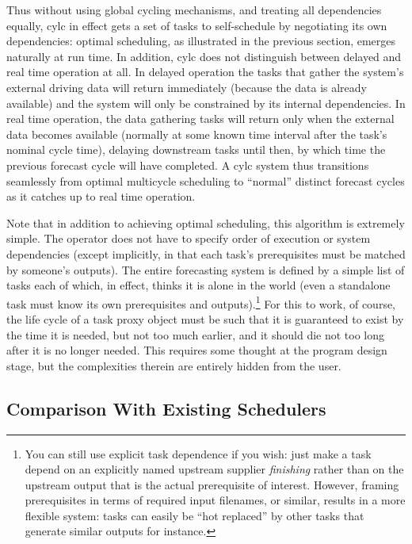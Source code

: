 \documentclass[11pt,a4paper]{article}
\begin{document}
Thus without using global cycling mechanisms, and treating all
dependencies equally, cylc in effect gets a set of tasks to
self-schedule by negotiating its own dependencies: optimal scheduling,
as illustrated in the previous section, emerges naturally at run time.
In addition, cylc does not distinguish between delayed and real time
operation at all. In delayed operation the tasks that gather the
system's external driving data will return immediately (because the data
is already available) and the system will only be constrained by its
internal dependencies. In real time operation, the data gathering tasks
will return only when the external data becomes available (normally at
some known time interval after the task's nominal cycle time), delaying
downstream tasks until then, by which time the previous forecast cycle
will have completed. A cylc system thus transitions seamlessly from
optimal multicycle scheduling to ``normal'' distinct forecast cycles as
it catches up to real time operation.

Note that in addition to achieving optimal scheduling, this algorithm is
extremely simple. The operator does not have to specify order of
execution or system dependencies (except implicitly, in that each task's
prerequisites must be matched by someone's outputs). The entire
forecasting system is defined by a simple list of tasks each of which,
in effect, thinks it is alone in the world (even a standalone task must
know its own prerequisites and outputs).\footnote{You can still use
explicit task dependence if you wish: just make a task depend on an
explicitly named upstream supplier {\em finishing} rather than on the
upstream output that is the actual prerequisite of interest. However,
framing prerequisites in terms of required input filenames, or similar,
results in a more flexible system: tasks can easily be ``hot replaced''
by other tasks that generate similar outputs for instance.}  For this to
work, of course, the life cycle of a task proxy object must be such that
it is guaranteed to exist by the time it is needed, but not too much
earlier, and it should die not too long after it is no longer needed.
This requires some thought at the program design stage, but the
complexities therein are entirely hidden from the user. 

\subsection{Comparison With Existing Schedulers} 
\label{ComparisonWithExistingSchedulers}
\end{document}
